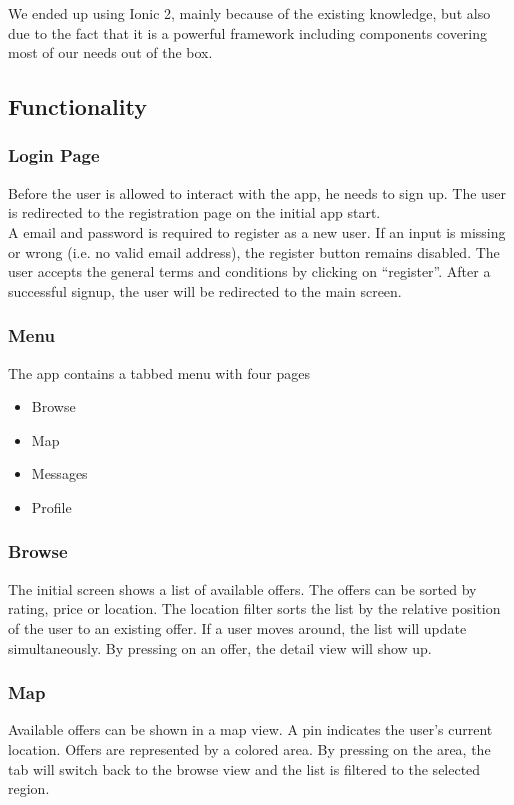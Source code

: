 \documentclass[11pt]{article} %
\begin{document}
We ended up using Ionic 2, mainly because of the existing knowledge, but also due to the fact that it is a powerful framework including components\cite{ionic2} covering most of our needs out of the box.
\newpage
\subsection{Functionality}
\subsubsection{Login Page}
Before the user is allowed to interact with the app, he needs to sign up. The user is redirected to the registration page on the initial app start.\\
A email and password is required to register as a new user. If an input is missing or wrong (i.e. no valid email address), the register button remains disabled. The user accepts the general terms and conditions by clicking on “register”. After a successful signup, the user will be redirected to the main screen. 

\subsubsection{Menu}
The app contains a tabbed menu with four pages

\begin{itemize}
  \item Browse
  \item Map
  \item Messages
  \item Profile
\end{itemize}

\subsubsection{Browse}
The initial screen shows a list of available offers. The offers can be sorted by rating, price or location. The location filter sorts the list by the relative position of the user to an existing offer. If a user moves around, the list will update simultaneously. By pressing on an offer, the detail view will show up.

\subsubsection{Map}
Available offers can be shown in a map view. A pin indicates the user's current location. Offers are represented by a colored area. By pressing on the area, the tab will switch back to the browse view and the list is filtered to the selected region.
\end{document}
